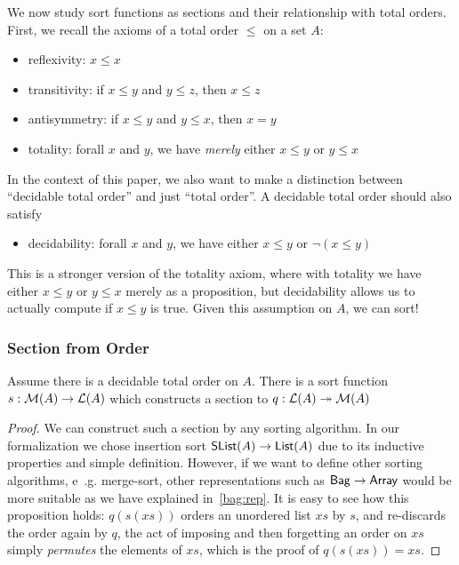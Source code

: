 We now study sort functions as sections and their relationship with total orders.
First, we recall the axioms of a total order $\leq$ on a set $A$:
\begin{itemize}
    \item reflexivity: $x \leq x$
    \item transitivity: if $x \leq y$ and $y \leq z$, then $x \leq z$
    \item antisymmetry: if $x \leq y$ and $y \leq x$, then $x = y$
    \item totality: forall $x$ and $y$, we have \emph{merely} either $x \leq y$ or $y \leq x$
\end{itemize}

In the context of this paper, we also want to make a distinction between ``decidable total order''
and just ``total order''. A decidable total order should also satisfy
\begin{itemize}
    \item decidability: forall $x$ and $y$, we have either $x \leq y$ or $\neg(x \leq y)$
\end{itemize}

This is a stronger version of the totality axiom, where with totality we have
either $x \leq y$ or $y \leq x$ merely as a proposition, but decidability allows us to actually
compute if $x \leq y$ is true. Given this assumption on $A$, we can sort!

\subsubsection{Section from Order}

\begin{proposition}
    Assume there is a decidable total order on $A$. There is a sort function $s: \mathcal{M}(A) \to \mathcal{L}(A)$
    which constructs a section to $q : \mathcal{L}(A) \twoheadrightarrow \mathcal{M}(A)$
\end{proposition}

\begin{proof}
    We can construct such a section by any sorting algorithm. In our formalization we chose
    insertion sort $\operatorname{\mathsf{SList}}(A) \to \operatorname{\mathsf{List}}(A)$ due to its inductive properties and simple definition.
    However, if we want to define other sorting algorithms, e .g. merge-sort,
    other representations such as $\operatorname{\mathsf{Bag}} \to \operatorname{\mathsf{Array}}$ would be more suitable as we have explained in~\cref{bag:rep}.
    It is easy to see how this
    proposition holds: $q(s(xs))$ orders an unordered list $xs$ by $s$, and re-discards the order again by
    $q$, the act of imposing and then forgetting an order on $xs$ simply \emph{permutes} the elements of $xs$,
    which is the proof of $q(s(xs)) = xs$.
\end{proof}

